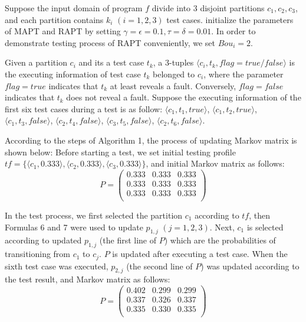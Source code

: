 \documentclass[10pt,journal,compsoc]{IEEEtran}
\begin{document}
Suppose the input domain of program $f$ divide into $3$ disjoint partitions $c_1, c_2, c_3$, and each partition contains $k_i$ $(i=1,2,3)$ test cases. initialize the parameters of MAPT and RAPT by setting $\gamma = \epsilon = 0.1, \tau=\delta=0.01$. In order to demonstrate testing process of RAPT conveniently, we set $Bou_i = 2$.

Given a partition $c_i$ and its a test case $t_k$, a 3-tuples $\langle c_i,t_k,flag = true/false \rangle$ is the executing information of test case $t_k$ belonged to $c_i$, where the parameter $flag = true$ indicates that $t_k$ at least reveals a fault. Conversely, $flag = false$ indicates that $t_k$ does not reveal a fault. Suppose the executing information of the first six test cases during a test is as follow: $\langle c_1,t_1,true \rangle$, $\langle c_1,t_2,true \rangle$, $\langle c_1,t_3,false\rangle$, $\langle c_2,t_4,false \rangle$, $\langle c_3,t_5,false \rangle$, $\langle c_2,t_6,false \rangle$.

According to the steps of Algorithm 1, the process of updating Markov matrix is shown below: Before starting a test, we set initial testing profile $tf = \{\langle c_1,0.333 \rangle, \langle c_2, 0.333\rangle, \langle c_3, 0.333 \rangle\}$, and initial Markov matrix as follows:
\begin{equation}
\label{eq:Inimatrix}
P =
\begin{pmatrix}
	0.333 & 0.333  & 0.333  \\
	0.333 & 0.333  & 0.333  \\
	0.333 & 0.333  & 0.333  \\
\end{pmatrix}
\end{equation}

In the test process, we first selected the partition $c_1$ according to $tf$, then Formulas 6 and 7 were used to update $p_{1,j}$ $(j = 1,2,3)$. Next, $c_1$ is selected according to updated $p_{1,j}$ (the first line of $P$) which are the probabilities of transitioning from $c_1$ to $c_j$. $P$ is updated after executing a test case. When the sixth test case was executed, $p_{2,j}$ (the second line of $P$) was updated according to the test result, and Markov matrix as follows:
\begin{equation}
\label{eq:sixthmatrix}
P =
\begin{pmatrix}
	0.402 & 0.299  & 0.299  \\
	0.337 & 0.326  & 0.337  \\
	0.335 & 0.330  & 0.335  \\
\end{pmatrix}
\end{equation}
\end{document}
